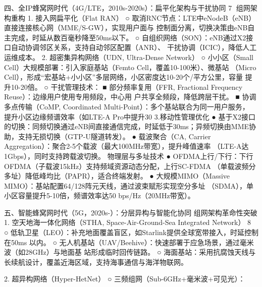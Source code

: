 四、全IP蜂窝网时代（4G/LTE，2010s-2020s）：扁平化架构与干扰协同
                                                            7
组网架构重构
1.   接入网扁平化（Flat RAN）
      ○ 取消RNC节点：LTE中eNodeB（eNB）直接连接核心网（MME/S-GW），实现用户面与
        控制面分离，切换决策由eNB自主完成，时延从数百毫秒降至50ms以下。
      ○ 自组织网络（SON）：eNB通过X2接口自动协调邻区关系，支持自动邻区配置（ANR）、
        干扰协调（ICIC），降低人工运维成本。
2.   超密集异构网络（UDN, Ultra-Dense Network）
      ○ 小小区（Small Cell）大规模部署：引入家庭基站（Femto Cell，覆盖10-100米）、微基站
        （Micro Cell），形成“宏基站+小小区”多层网络，小区密度达10-20个/平方公里，容量
        提升10-20倍。
      ○ 干扰管理技术：
         ■ 部分频率复用（FFR, Fractional Frequency Reuse）：边缘用户使用专用频段，中心用
           户共享全频段，降低跨层干扰。
         ■ 协调多点传输（CoMP, Coordinated Multi-Point）：多个基站联合为同一用户服务，
           提升小区边缘频谱效率（如LTE-A Pro中提升30%
3.移动性管理优化
● 基于X2接口的切换：同频切换通过eNB间直接通信完成，时延低于30ms；异频切换由MME协
  助，支持无损切换（GTP-U隧道转发）。
● 载波聚合（CA, Carrier Aggregation）：聚合2-5个载波（最大100MHz带宽），提升峰值速率
  （LTE-A达1Gbps），同时支持跨载波切换。
物理层与多址技术
●    OFDMA上行/下行：下行OFDMA（子载波15kHz）支持频域资源动态分配，上行SC-FDMA
  （单载波频分多址）降低峰均比（PAPR），适合终端发射。
● 大规模MIMO（Massive MIMO）：基站配置64/128阵元天线，通过波束赋形实现空分多址
  （SDMA），单小区容量提升5-10倍，频谱效率达50 bps/Hz（20MHz带宽）。

五、智能蜂窝网时代（5G，2020s-）：分层异构与智能化协同
组网架构革命性突破
1.   空天地海一体化网络（STHA, Space-Air-Ground-Sea Integrated Network）
                                                                8
      ○   低轨卫星（LEO）：补充地面覆盖盲区，如Starlink提供全球宽带接入，时延控制在50ms
          以内。
      ○   无人机基站（UAV/Beehive）：快速部署于应急场景，通过毫米波（如28GHz）与地面基
        站形成临时回传链路。
      ○ 海面基站：采用抗腐蚀天线与长续航设计，覆盖近海区域，支持海事通信与海洋物联网。

2.   超异构网络（Hyper-HetNet）
      ○ 三频组网（Sub-6GHz+毫米波+可见光）：


